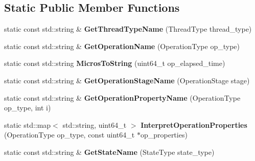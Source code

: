 \subsection*{Static Public Member Functions}
\begin{DoxyCompactItemize}
\item 
static const std\+::string \& {\bfseries Get\+Thread\+Type\+Name} (Thread\+Type thread\+\_\+type)\hypertarget{structrocksdb_1_1ThreadStatus_ac6a71fe25af7e986c9c02d5e88f71fb2}{}\label{structrocksdb_1_1ThreadStatus_ac6a71fe25af7e986c9c02d5e88f71fb2}

\item 
static const std\+::string \& {\bfseries Get\+Operation\+Name} (Operation\+Type op\+\_\+type)\hypertarget{structrocksdb_1_1ThreadStatus_a24f01def129174ef65b81e8b191082c0}{}\label{structrocksdb_1_1ThreadStatus_a24f01def129174ef65b81e8b191082c0}

\item 
static const std\+::string {\bfseries Micros\+To\+String} (uint64\+\_\+t op\+\_\+elapsed\+\_\+time)\hypertarget{structrocksdb_1_1ThreadStatus_a3d4afb5df7fbc6b58a74ca5546b27954}{}\label{structrocksdb_1_1ThreadStatus_a3d4afb5df7fbc6b58a74ca5546b27954}

\item 
static const std\+::string \& {\bfseries Get\+Operation\+Stage\+Name} (Operation\+Stage stage)\hypertarget{structrocksdb_1_1ThreadStatus_ad18376b37905f157fe8312e46414ffb4}{}\label{structrocksdb_1_1ThreadStatus_ad18376b37905f157fe8312e46414ffb4}

\item 
static const std\+::string \& {\bfseries Get\+Operation\+Property\+Name} (Operation\+Type op\+\_\+type, int i)\hypertarget{structrocksdb_1_1ThreadStatus_a1b123f25ee10af66bf5406f58acb01e3}{}\label{structrocksdb_1_1ThreadStatus_a1b123f25ee10af66bf5406f58acb01e3}

\item 
static std\+::map$<$ std\+::string, uint64\+\_\+t $>$ {\bfseries Interpret\+Operation\+Properties} (Operation\+Type op\+\_\+type, const uint64\+\_\+t $\ast$op\+\_\+properties)\hypertarget{structrocksdb_1_1ThreadStatus_a71367b1d1d6020f527f9ad1627f50127}{}\label{structrocksdb_1_1ThreadStatus_a71367b1d1d6020f527f9ad1627f50127}

\item 
static const std\+::string \& {\bfseries Get\+State\+Name} (State\+Type state\+\_\+type)\hypertarget{structrocksdb_1_1ThreadStatus_ab313b75af626d465d29a4d5ea56cab7e}{}\label{structrocksdb_1_1ThreadStatus_ab313b75af626d465d29a4d5ea56cab7e}

\end{DoxyCompactItemize}
